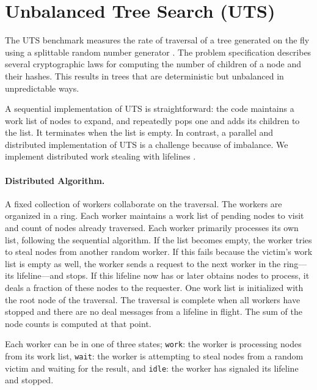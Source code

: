\section{Unbalanced Tree Search (UTS)}
\label{sec:uts}

The UTS benchmark measures the rate of traversal of a
tree generated on the fly using a splittable random number generator
\cite{lcpc06}. The problem specification describes several cryptographic laws
for computing the number of children of a node and their hashes. This results in
trees that are deterministic but unbalanced in unpredictable ways. 

A sequential implementation of UTS is straightforward: the code maintains a
work list of nodes to expand, and repeatedly pops one and adds its children to
the list. It terminates when the list is empty. %
In contrast, a parallel and distributed implementation of UTS
is a challenge because of imbalance. We implement distributed work stealing
with lifelines \cite{ppopp11}.

\paragraph{Distributed Algorithm.} A fixed collection of workers collaborate on
the traversal. The workers are organized in a ring. Each worker maintains a
work list of pending nodes to visit and count of nodes already traversed. Each
worker primarily processes its own list, following the sequential algorithm. If
the list becomes empty, the worker tries to steal nodes from another random
worker. If this fails because the victim's work list is empty as well, the
worker sends a request to the next worker in the ring---its lifeline---and
stops. If this lifeline now has or later obtains nodes to process, it deals a
fraction of these nodes to the requester. One work list is initialized with the
root node of the traversal. The traversal is complete when all workers have
stopped and there are no deal messages from a lifeline in flight. The sum of
the node counts is computed at that point.

Each worker can be in one of three states; \lstinline{work}: the worker is processing nodes from its work list,
\lstinline{wait}: the worker is attempting to steal nodes from a random victim and waiting for the result, and
\lstinline{idle}: the worker has signaled its lifeline and stopped.

